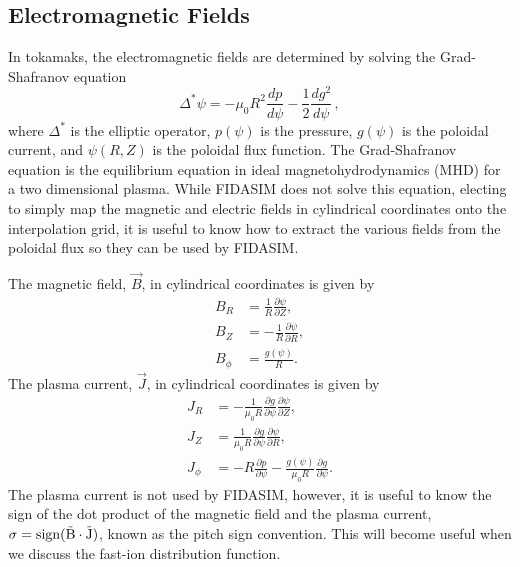\subsection{Electromagnetic Fields}
In tokamaks, the electromagnetic fields are determined by solving the Grad-Shafranov equation
\begin{equation}\label{eq:grad_shafranov}
    \Delta^* \psi = - \mu_0 R^2 \frac{dp}{d\psi} - \frac{1}{2}\frac{dg^2}{d\psi}\,,
\end{equation}
where $\Delta^*$ is the elliptic operator, $p(\psi)$ is the pressure, $g(\psi)$ is the poloidal current, and $\psi(R,Z)$ is the poloidal flux function.
The Grad-Shafranov equation is the equilibrium equation in ideal magnetohydrodynamics (MHD) for a two dimensional plasma. While FIDASIM does not solve this equation, electing to simply map the magnetic and electric fields in cylindrical coordinates onto the interpolation grid, it is useful to know how to extract the various fields from the poloidal flux so they can be used by FIDASIM.

The magnetic field, $\vec{B}$, in cylindrical coordinates is given by
\begin{equation}\label{eq:bfield}
\begin{split}
    B_R &=  \frac{1}{R}\frac{\partial \psi}{\partial Z}, \\
    B_Z &= -\frac{1}{R}\frac{\partial \psi}{\partial R}, \\
    B_{\phi} &= \frac{g(\psi)}{R}.
\end{split}
\end{equation}
The plasma current, $\vec{J}$, in cylindrical coordinates is given by
\begin{equation}\label{eq:jfield}
\begin{split}
    J_R &= -\frac{1}{\mu_0 R}\frac{\partial g}{\partial \psi} \frac{\partial \psi}{\partial Z}, \\
    J_Z &= \frac{1}{\mu_0 R}\frac{\partial g}{\partial \psi} \frac{\partial \psi}{\partial R}, \\
    J_{\phi} &= -R \frac{\partial p}{\partial \psi} - \frac{g(\psi)}{\mu_0 R}\frac{\partial g}{\partial \psi}.
\end{split}
\end{equation}
The plasma current is not used by FIDASIM, however, it is useful to know the sign of the dot product of the magnetic field and the plasma current, $\sigma = \rm{sign}(\vec{B}\cdot\vec{J})$, known as the pitch sign convention. This will become useful when we discuss the fast-ion distribution function.

